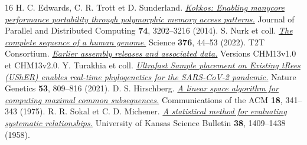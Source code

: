 \begin{thebibliography}{16}
 H. C. Edwards, C. R. Trott et D. Sunderland. \href{https://doi.org/10.1016/j.jpdc.2014.07.003}{\emph{Kokkos: Enabling manycore performance portability through polymorphic memory access patterns.}} Journal of Parallel and Distributed Computing \textbf{74}, 3202--3216 (2014).
 S. Nurk et coll. \href{https://doi.org/10.1126/science.abj6987}{\emph{The complete sequence of a human genome.}} Science \textbf{376}, 44--53 (2022).
 T2T Consortium. \href{https://github.com/marbl/CHM13/blob/master/Earlier_assembly_releases_and_associated_data.md}{\emph{Earlier assembly releases and associated data.}} Versions CHM13v1.0 et CHM13v2.0.
 Y. Turakhia et coll. \href{https://doi.org/10.1038/s41588-021-00862-7}{\emph{Ultrafast Sample placement on Existing tRees (UShER) enables real-time phylogenetics for the SARS-CoV-2 pandemic.}} Nature Genetics \textbf{53}, 809--816 (2021).
 D. S. Hirschberg. \href{https://doi.org/10.1145/360825.360861}{\emph{A linear space algorithm for computing maximal common subsequences.}} Communications of the ACM \textbf{18}, 341--343 (1975).
 R. R. Sokal et C. D. Michener. \href{https://www.biodiversitylibrary.org/part/385476}{\emph{A statistical method for evaluating systematic relationships.}} University of Kansas Science Bulletin \textbf{38}, 1409--1438 (1958).
\end{thebibliography}
